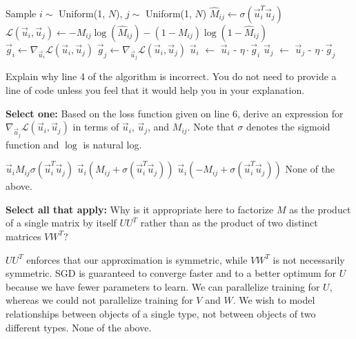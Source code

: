 \documentclass[11pt,addpoints,answers]{exam}
\newcommand{\sall}{\textbf{Select all that apply: }}
\newcommand{\sone}{\textbf{Select one: }}
\begin{document}
\begin{questions}
\begin{parts}
\begin{algorithm}
\begin{algorithmic}[1]
    \State Sample $i \sim$ Uniform(1, $N$), $j \sim$ Uniform(1, $N$)
    \State $\hat{M}_{ij} \gets \sigma(\vec{u}_i^T \vec{u}_j)$ 
    \State $\mathcal{L}(\vec{u}_i, \vec{u}_j) \gets -M_{ij} \log(\hat{M}_{ij}) - (1-M_{ij})\log(1 - \hat{M}_{ij})$
    \State $\vec{g}_i \gets \nabla_{\vec{u}_i} \mathcal{L}(\vec{u}_i, \vec{u}_j)$
    \State $\vec{g}_j \gets \nabla_{\vec{u}_j} \mathcal{L}(\vec{u}_i, \vec{u}_j)$
    \State $\vec{u}_i$ $\gets$ $\vec{u}_i$ - $\eta \cdot \vec{g}_i$
    \State $\vec{u}_j$ $\gets$ $\vec{u}_j$ - $\eta \cdot \vec{g}_j$
\EndWhile
\end{algorithmic}
\end{algorithm}
\newpage
\begin{subparts}
\subpart[1] Explain why line 4 of the algorithm is incorrect.
You do not need to provide a line of code unless you feel that it would help you in your explanation.

    \begin{your_solution}[title=Explanation, height=3cm, width=0.9\textwidth]
    \end{your_solution}

\subpart[1] \sone Based on the loss function given on line 6, derive an expression for $\nabla_{\vec{u}_j} \mathcal{L}(\vec{u}_i, \vec{u}_j)$ in terms of $\vec{u}_i$, $\vec{u}_j$, and $M_{ij}$. Note that $\sigma$ denotes the sigmoid function and $\log$ is natural log.
    \begin{checkboxes}
    \choice $\vec{u}_i M_{ij} \sigma(\vec{u}_i^T \vec{u}_j)$
    \choice $\vec{u}_i(M_{ij} + \sigma(\vec{u}_i^T \vec{u}_j))$
    \choice $\vec{u}_i(-M_{ij} + \sigma(\vec{u}_i^T \vec{u}_j))$
    \choice None of the above.
    \end{checkboxes}
         
    

\subpart[2] \sall Why is it appropriate here to factorize $M$ as the product of a single matrix by itself $U U^T$ rather than as the product of two distinct matrices $VW^T$?
    {\checkboxchar{$\Box$} \checkedchar{$\blacksquare$}
    \begin{checkboxes}
    \choice $U U^T$ enforces that our approximation is symmetric, while $VW^T$ is not necessarily symmetric.
    \choice SGD is guaranteed to converge faster and to a better optimum for $U$ because we have fewer parameters to learn.
    \choice We can parallelize training for $U$, whereas we could not parallelize training for $V$ and $W$.
    \choice We wish to model relationships between objects of a single type, not between objects of two different types.
    \choice None of the above.
    \end{checkboxes}
    }
    


\end{subparts}
\end{parts}
\end{questions}
\end{document}
